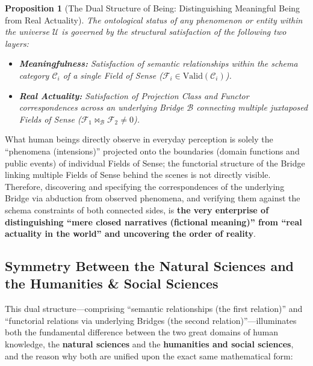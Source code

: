 \documentclass[11pt,a4paper]{article}
\theoremstyle{definition}
\theoremstyle{plain}
\newtheorem{proposition}{Proposition}[section]
\theoremstyle{remark}
\newcommand{\Valid}{\mathrm{Valid}}
\begin{document}
\begin{proposition}[The Dual Structure of Being: Distinguishing Meaningful Being from Real Actuality]\label{prop:dual-being}
The ontological status of any phenomenon or entity within the universe $\mathcal{U}$ is governed by the structural satisfaction of the following two layers:
\begin{itemize}
    \item \textbf{Meaningfulness:} Satisfaction of semantic relationships within the schema category $\mathcal{C}_i$ of a single Field of Sense ($\mathcal{F}_i \in \Valid(\mathcal{C}_i)$).
    \item \textbf{Real Actuality:} Satisfaction of Projection Class and Functor correspondences across an underlying Bridge $\mathcal{B}$ connecting multiple juxtaposed Fields of Sense ($\mathcal{F}_1 \bowtie_{\mathcal{B}} \mathcal{F}_2 \neq 0$).
\end{itemize}
\end{proposition}

What human beings directly observe in everyday perception is solely the ``phenomena (intensions)'' projected onto the boundaries (domain functions and public events) of individual Fields of Sense; the functorial structure of the Bridge linking multiple Fields of Sense behind the scenes is not directly visible. Therefore, discovering and specifying the correspondences of the underlying Bridge via abduction from observed phenomena, and verifying them against the schema constraints of both connected sides, is \textbf{the very enterprise of distinguishing ``mere closed narratives (fictional meaning)'' from ``real actuality in the world'' and uncovering the order of reality}.

\subsection{Symmetry Between the Natural Sciences and the Humanities \& Social Sciences}
This dual structure---comprising ``semantic relationships (the first relation)'' and ``functorial relations via underlying Bridges (the second relation)''---illuminates both the fundamental difference between the two great domains of human knowledge, the \textbf{natural sciences} and the \textbf{humanities and social sciences}, and the reason why both are unified upon the exact same mathematical form:
\end{document}
